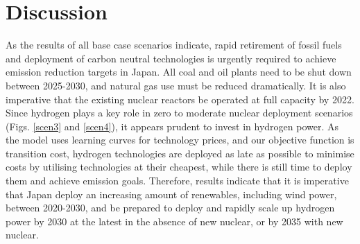 \section{Discussion}


As the results of all base case scenarios indicate, rapid retirement of fossil fuels and deployment of carbon neutral technologies is urgently required to achieve emission reduction targets in Japan. All coal and oil plants need to be shut down between 2025-2030, and natural gas use must be reduced dramatically. It is also imperative that the existing nuclear reactors be operated at full capacity by 2022. Since hydrogen plays a key role in zero to moderate nuclear deployment scenarios (Figs. \ref{scen3} and \ref{scen4}), it appears prudent to invest in hydrogen power. As the model uses learning curves for technology prices, and our objective function is transition cost, hydrogen technologies are deployed as late as possible to minimise costs by utilising technologies at their cheapest, while there is still time to deploy them and achieve emission goals. Therefore, results indicate that it is imperative that Japan deploy an increasing amount of renewables, including wind power, between 2020-2030, and be prepared to deploy and rapidly scale up hydrogen power by 2030 at the latest in the absence of new nuclear, or by 2035 with new nuclear.

